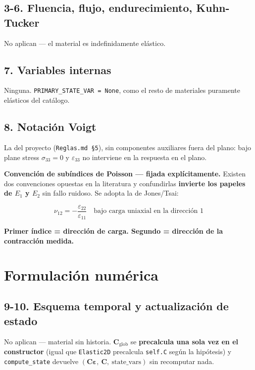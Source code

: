 \documentclass[11pt,letterpaper,oneside]{report}
\begin{document}
\subsection{3-6. Fluencia, flujo, endurecimiento, Kuhn-Tucker}

No aplican --- el material es indefinidamente elástico.

\subsection{7. Variables internas}

Ninguna. \texttt{PRIMARY\_STATE\_VAR = None}, como el resto de materiales puramente elásticos del catálogo.

\subsection{8. Notación Voigt}

La del proyecto (\texttt{Reglas.md §5}), sin componentes auxiliares fuera del plano: bajo plane stress $\sigma_{33}=0$ y $\varepsilon_{33}$ no interviene en la respuesta en el plano.

\textbf{Convención de subíndices de Poisson --- fijada explícitamente.} Existen dos convenciones opuestas en la literatura y confundirlas \textbf{invierte los papeles de $E_1$ y $E_2$} sin fallo ruidoso. Se adopta la de Jones/Tsai:

\[
\nu_{12} = -\frac{\varepsilon_{22}}{\varepsilon_{11}} \quad\text{bajo carga uniaxial en la dirección 1}
\]

\textbf{Primer índice = dirección de carga. Segundo = dirección de la contracción medida.}


\section{Formulación numérica}

\subsection{9-10. Esquema temporal y actualización de estado}

No aplican --- material sin historia. $\mathbf C_{\text{glob}}$ se \textbf{precalcula una sola vez en el constructor} (igual que \texttt{Elastic2D} precalcula \texttt{self.C} según la hipótesis) y \texttt{compute\_state} devuelve $(\mathbf C\boldsymbol\varepsilon,\ \mathbf C,\ \text{state\_vars})$ sin recomputar nada.
\end{document}
